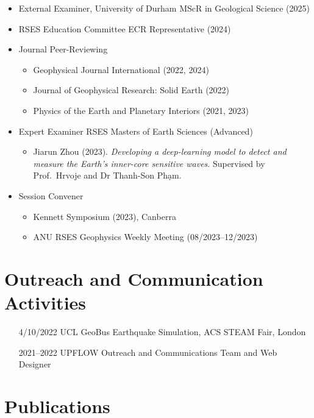 \begin{itemize}[label={}]
    \item External Examiner, University of Durham MScR in Geological Science (2025)
    \item RSES Education Committee ECR Representative (2024)
    \item Journal Peer-Reviewing
          \begin{itemize}
              \item Geophysical Journal International (2022, 2024)
              \item Journal of Geophysical Research: Solid Earth (2022)
              \item Physics of the Earth and Planetary Interiors (2021, 2023)
          \end{itemize}
    \item Expert Examiner RSES Masters of Earth Sciences (Advanced)
          \begin{itemize}
              \item Jiarun Zhou (2023). \textit{Developing a deep-learning model to detect and measure the Earth's inner-core sensitive waves}. Supervised by Prof.\ Hrvoje \tkalcic{} and Dr Thanh-Son Ph\d{a}m.
          \end{itemize}
    \item Session Convener
          \begin{itemize}
              \item Kennett Symposium (2023), Canberra
              \item ANU RSES Geophysics Weekly Meeting (08/2023--12/2023)
          \end{itemize}
\end{itemize}

\section{Outreach and Communication Activities}

\begin{itemize}
    \item[4/10/2022] UCL GeoBus Earthquake Simulation, ACS STEAM Fair, London
    \item[2021--2022] UPFLOW Outreach and Communications Team and Web Designer
\end{itemize}

\setlist{} %
\clearpage

\section{Publications}
